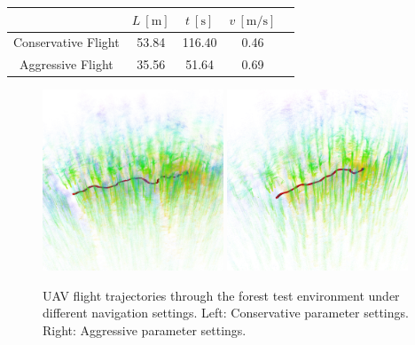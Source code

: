             \begin{table}[H]
                \centering
                \renewcommand{\arraystretch}{1.2}
                \begin{tabular}{|c|c|c|c|c|}
                \hline
                                    & \( L \ [\mathrm{m}] \) & \( t \ [\mathrm{s}] \) &  \( v \ [\mathrm{m/s}] \)     \\ \hline
                Conservative Flight & 53.84                   & 116.40                  &  0.46                          \\ \hline
                Aggressive Flight    & 35.56                   &  51.64                  &  0.69                          \\ \hline
                \end{tabular}
            \end{table}

            \begin{figure}[htbp]
                \centering
                \includegraphics[width=0.48\textwidth]{./fig/rviz/flight_484.png}
                \includegraphics[width=0.48\textwidth]{./fig/rviz/flight_486.png}
                \caption{
                    \ac{UAV} flight trajectories through the forest test environment under different navigation settings. Left: Conservative parameter settings. Right: Aggressive parameter settings.
                }
                \label{fig:rbl_forest_conservative_flight_path}
            \end{figure}

